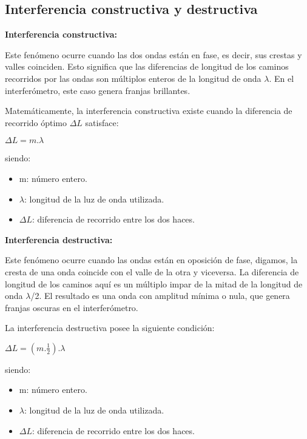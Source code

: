 \documentclass[a4paper, 12pt]{article}
\begin{document}
	\subsection{Interferencia constructiva y destructiva}
	
	\textbf{Interferencia constructiva:}
	
	\indent Este fenómeno ocurre cuando las dos ondas están en fase, es decir, sus crestas y valles coinciden. Esto significa que las diferencias de longitud de los caminos recorridos por las ondas son múltiplos enteros de la longitud de onda $\lambda$. En el interferómetro, este caso genera franjas brillantes.
	
	\indent Matemáticamente, la interferencia constructiva existe cuando la diferencia de recorrido óptimo $\Delta L$ satisface:
	
	\begin{center}
		$\Delta L = m . \lambda$ \\
	\end{center}
	
	siendo:
	\begin{itemize}
		\item m: número entero.
		\item $\lambda$: longitud de la luz de onda utilizada.
		\item $\Delta L$: diferencia de recorrido entre los dos haces.
	\end{itemize} 
	
	\textbf{Interferencia destructiva:}

	\indent Este fenómeno ocurre cuando las ondas están en oposición de fase, digamos, la cresta de una onda coincide con el valle de la otra y viceversa. La diferencia de longitud de los caminos aquí es un múltiplo impar de la mitad de la longitud de onda $\lambda$/2. El resultado es una onda con amplitud mínima o nula, que genera franjas oscuras en el interferómetro.
	
	\indent La interferencia destructiva posee la siguiente condición:
	
	\begin{center}
		$\Delta L = (m . {\frac{1}{2}}) . \lambda$
	\end{center}
	
	siendo:
	\begin{itemize}
		\item m: número entero.
		\item $\lambda$: longitud de la luz de onda utilizada.
		\item $\Delta L$: diferencia de recorrido entre los dos haces.
	\end{itemize} 
	
\end{document}
